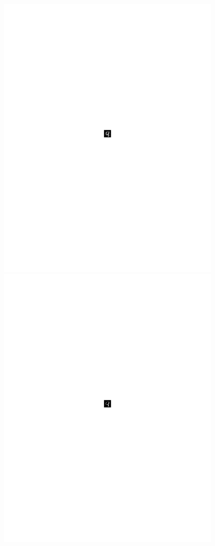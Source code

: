 \begin{figure}[b]
\begin{minipage}{.09\textwidth}
\end{minipage}
\begin{minipage}{.09\textwidth}
	\centering
    \includegraphics[width =0.9\linewidth, trim = 300 400 300 375, clip]{figs/goodfellow9pca.pdf}
\end{minipage}
\begin{minipage}{.09\textwidth}
	\centering
    \includegraphics[width =0.9\linewidth, trim = 300 400 300 375, clip]{figs/papernot9.pdf}

\end{minipage}
\end{figure}
